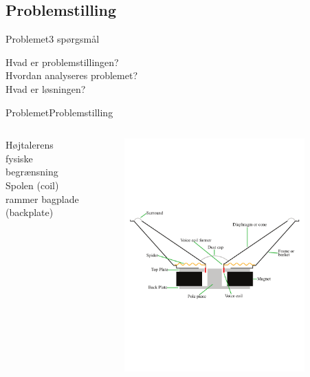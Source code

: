 \subsection{Problemstilling}
\begin{frame}{Problemet}{3 spørgsmål}
	\begin{center}
	Hvad er problemstillingen? \\
	\vspace{5mm}
	Hvordan analyseres problemet? \\
	\vspace{5mm}
	Hvad er løsningen? \\
	\end{center}
\end{frame}


\begin{frame}{Problemet}{Problemstilling}
\begin{columns}
\begin{column}{0.3\textwidth}
	Højtalerens fysiske begrænsning \\
	\vspace{5mm}
	Spolen (coil) rammer bagplade (backplate)
\end{column}
\begin{column}{0.65\textwidth}
\begin{figure}
	\centering
	\includegraphics[width=0.9\textwidth]{Speaker-cross-section}
	\end{figure}
\end{column}
\end{columns}
\end{frame}


